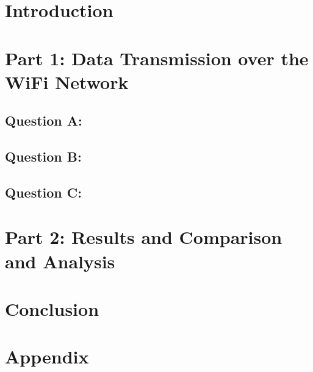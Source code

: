 \documentclass[a4paper]{article}
\begin{document}
\hypersetup{pageanchor=false}

\hypersetup{pageanchor=true}

\tableofcontents
\clearpage
\section{Introduction}

\section{Part 1: Data Transmission over the WiFi Network}
\subsection{Question A:}


\subsection{Question B:}

\subsection{Question C:}



\section{Part 2: Results and Comparison and Analysis}

\section{Conclusion}

\clearpage
\section{Appendix}

\clearpage
\printbibliography
\end{document}
